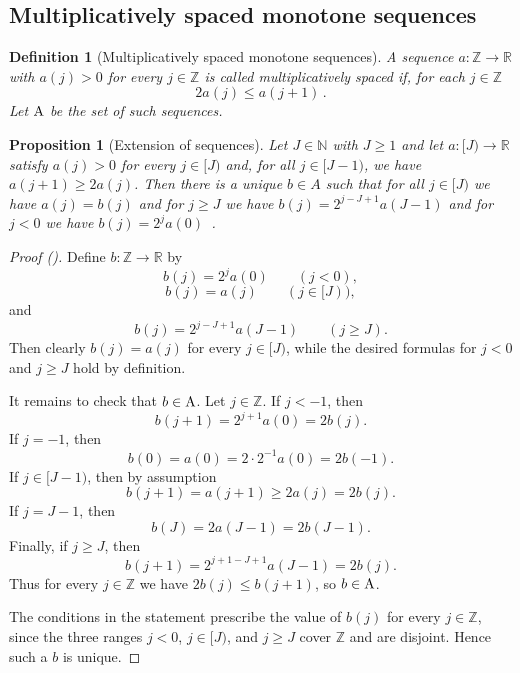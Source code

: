 \documentclass[12pt,reqno]{amsart}
\newcommand{\auto}{{({\tiny\faCar})}}
\theoremstyle{plain}
\newtheorem{proposition}[theorem]{Proposition}
\newtheorem{definition}[theorem]{Definition}
\numberwithin{equation}{section}
\theoremstyle{remark}
\newcommand{\uses}[1]{}
\newcommand{\usesdefs}[1]{}
\newcommand{\Z}{{\mathbb Z}}
\newcommand{\R}{{\mathbb R}}
\newcommand{\N}{{\mathbb N}}
\begin{document}
\subsection{Multiplicatively spaced monotone sequences}

\begin{definition}[Multiplicatively spaced monotone sequences]\label{multiplicatively spaced monotone sequences}\uses{}\usesdefs{}
A sequence $a:\Z\to\R$ with $a(j)>0$ for every $j\in\Z$ is called multiplicatively spaced if, for each $j\in\Z$
\begin{equation}\label{auto:spaced-sequence-growth}
    2a(j)\le a(j+1)\, .
\end{equation}
Let ${\rm A}$ be the set of such sequences.
\end{definition}


\begin{proposition}[Extension of sequences]\label{Extension of sequences}\uses{}\usesdefs{multiplicatively spaced monotone sequences}
Let $J\in\N$ with $J\ge1$ and let $a:[J)\to\R$ satisfy $a(j)>0$ for every $j\in[J)$ and, for all $j\in[J-1)$, we have $a(j+1)\ge 2a(j)$.
Then there is a unique $b\in A$ such that for all $j\in [J)$ we have $a(j)=b(j)$ and for $j\ge J$ we have $b(j)=2^{j-J+1} a(J-1)$ and for $j<0$ we have $b(j)=2^j a(0)$\, .
\end{proposition}
\begin{proof}[Proof \auto]
Define $b:\Z\to\R$ by
\[
b(j)=2^ja(0)\qquad(j<0),
\]
\[
b(j)=a(j)\qquad(j\in[J)),
\]
and
\[
b(j)=2^{j-J+1}a(J-1)\qquad(j\ge J).
\]
Then clearly $b(j)=a(j)$ for every $j\in[J)$, while the desired formulas for
$j<0$ and $j\ge J$ hold by definition.

It remains to check that $b\in {\rm A}$. Let $j\in\Z$. If $j<-1$, then
\[
 b(j+1)=2^{j+1}a(0)=2b(j).
\]
If $j=-1$, then
\[
 b(0)=a(0)=2\cdot 2^{-1}a(0)=2b(-1).
\]
If $j\in [J-1)$, then by assumption
\[
 b(j+1)=a(j+1)\ge 2a(j)=2b(j).
\]
If $j=J-1$, then
\[
 b(J)=2a(J-1)=2b(J-1).
\]
Finally, if $j\ge J$, then
\[
 b(j+1)=2^{j+1-J+1}a(J-1)=2b(j).
\]
Thus for every $j\in\Z$ we have $2b(j)\le b(j+1)$, so $b\in{\rm A}$.

The conditions in the statement prescribe the value of $b(j)$ for every
$j\in\Z$, since the three ranges $j<0$, $j\in[J)$, and $j\ge J$ cover
$\Z$ and are disjoint. Hence such a $b$ is unique.
\end{proof}
\end{document}
